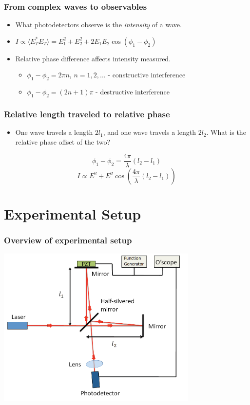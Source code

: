 \documentclass{beamer}
\begin{document}
\begin{frame}
  \frametitle{From complex waves to observables}
  \begin{itemize}
    \item
    What photodetectors observe is the \textit{intensity} of a wave.
  \item
    $I \propto \langle E_T^* E_T \rangle = E_1^2 + E_2^2 + 2 E_1 E_2 \cos(\phi_1 - \phi_2)$
  \item Relative phase difference affects intensity measured.
    \pause
    \begin{itemize}
      \item $\phi_1 - \phi_2 = 2 \pi n$, $n = 1, 2, \ldots$ - constructive interference
        \pause
      \item $\phi_1 - \phi_2 = (2n + 1) \pi$ - destructive interference
    \end{itemize}
\end{itemize}
\end{frame}

\begin{frame}
  \frametitle{Relative length traveled to relative phase}
  \begin{itemize}
    \item One wave travels a length $2l_1$, and one wave travels a length $2l_2$. What is the relative phase offset of the two?
    \end{itemize}
  \begin{equation*}
    \phi_1 - \phi_2 = \frac{4\pi}{\lambda} \left(l_2 - l_1 \right)
  \end{equation*}
  \pause
    \begin{equation*} 
      I \propto E^2  + E^2 \cos\left(\frac{4\pi}{\lambda} (l_2 - l_1) \right)
    \end{equation*}
  \end{frame}

\section{Experimental Setup}
\begin{frame}
  \frametitle{Overview of experimental setup}
  \hspace{25pt}\includegraphics[width=10cm]{setup.png}
\end{frame}
\end{document}
